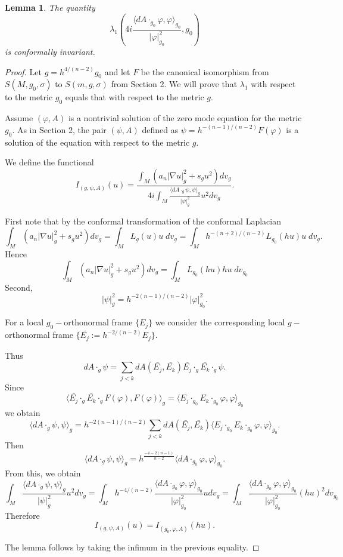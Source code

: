 \documentclass[11pt]{amsart}
\theoremstyle{plain}
\newtheorem{lemma}[theorem]{Lemma}
\numberwithin{equation}{section}
\theoremstyle{plain}
\begin{document}
\begin{lemma}
The quantity $$\lambda_1\left(4i\frac{\langle dA\cdot_{g_0}\varphi,\varphi\rangle_{g_0}}{|\varphi|_{g_0}^2},g_0\right)$$ is conformally invariant.
\end{lemma}
\begin{proof}
Let $g=h^{4/(n-2)}g_0$ and let $F$ be the canonical isomorphism from $S(M,g_0,\sigma)$ to $S(m,g,\sigma)$ from Section 2.
We will prove that $\lambda_1$ with respect to the metric $g_0$ equals that with respect to the metric $g$.

Assume $(\varphi,A)$ is a nontrivial solution of the zero mode equation for the metric $g_0$. As in Section 2, the pair $(\psi,A)$ defined as $\psi=h^{-(n-1)/(n-2)}F(\varphi)$ is a solution of the equation with respect to the metric $g$.

We define the functional
$$I_{(g,\psi,A)}(u)=\dfrac{\int_M(a_n|\nabla u|_g^2+s_gu^2)dv_g}{4i\int_M \frac{\langle dA\cdot_g\psi,\psi\rangle_g}{|\psi|_g^2}  u^2dv_g  }.$$

First note that by the conformal transformation of the conformal Laplacian $$\int_M(a_n|\nabla u|_g^2+s_gu^2)dv_g=\int_M L_g(u)u\;dv_g=\int_Mh^{-(n+2)/(n-2)}L_{g_0}(hu)u\;dv_{g}.$$
Hence $$\int_M(a_n|\nabla u|_g^2+s_gu^2)dv_g=\int_ML_{g_0}(hu)hu\;dv_{g_0}$$
Second, $$|\psi|_{g}^2=h^{-2(n-1)/(n-2)}|\varphi|_{g_0}^2.$$

For a local $g_0-$orthonormal frame $\{E_j\}$  we consider the corresponding local $g-$orthonormal frame $\{\bar{E_j}:=h^{-2/(n-2)}E_j\}.$

Thus 
$$
dA\cdot_{g}\psi=\sum\limits_{j<k}dA(\bar{E_j},\bar{E_k})\bar{E_j}\cdot_{g} \bar{E_k}\cdot_{g}\psi.
$$
Since $$\langle \bar{E_j}\cdot_{g} \bar{E_k}\cdot_{g}F(\varphi),F(\varphi)\rangle_g=\langle E_j\cdot_{g_0} E_k\cdot_{g_0}\varphi,\varphi\rangle_{g_0}$$
we obtain $$\langle dA\cdot_{g}\psi,\psi\rangle_g=h^{-2(n-1)/(n-2)}\sum\limits_{j<k}dA(\bar{E_j},\bar{E_k})\langle E_j\cdot_{g_0} E_k\cdot_{g_0}\varphi,\varphi\rangle_{g_0}.$$
Then $$\langle dA\cdot_{g}\psi,\psi\rangle_g=h^{\frac{-4-2(n-1)}{n-2}}\langle dA\cdot_{g_0}\varphi,\varphi\rangle_{g_0}.$$
From this, we obtain 
$$\int_M \frac{\langle dA\cdot_g\psi,\psi\rangle_g}{|\psi|_g^2}  u^2dv_g =\int_M h^{-4/(n-2)}\frac{\langle dA\cdot_{g_0}\varphi,\varphi\rangle_{g_0}}{|\varphi|_{g_0}^2}  udv_{g}=\int_M \frac{\langle dA\cdot_{g_0}\varphi,\varphi\rangle_{g_0}}{|\varphi|_{g_0}^2}  (hu)^2dv_{g_0} $$
Therefore $$I_{(g,\psi,A)}(u)=I_{(g_0,\varphi,A)}(hu).$$

The lemma follows by taking the infimum in the previous equality. 
\end{proof}
\end{document}
